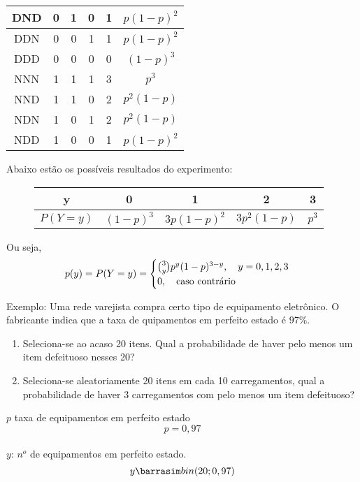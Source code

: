 \documentclass[11pt,a4paper]{book}
\begin{document}
\begin{description}
\begin{tabular}{c c c c c c }
       DND& 0 & 1 & 0 & 1 & $p(1-p)^2$\\\midrule

       DDN& 0 & 0 & 1 & 1 & $p(1-p)^2$\\\midrule

       DDD&  0 & 0 & 0 & 0 & $(1-p)^3$\\\midrule

       NNN&   1 & 1 & 1 & 3 & $p^3$\\\midrule

       NND& 1 & 1 & 0 & 2 & $p^2(1-p)$\\\midrule

       NDN& 1 & 0 & 1 & 2 & $p^2(1-p)$\\\midrule

       NDD& 1 & 0 & 0 & 1 & $p(1-p)^2$ \\ \bottomrule

     \end{tabular}

     Abaixo estão os possíveis resultados do experimento:


     \begin{figure} 
       \centering
       \begin{tabular}{c c c c c}
         \toprule
         y&0&1&2&3\\ \midrule
         $P(Y=y)$&$(1-p)^3$&$3p(1-p)^2$&$3p^2(1-p)$&$p^3$\\ \bottomrule
       \end{tabular}
       \label{fig:127}
     \end{figure}
      Ou seja,
      \begin{align*}
        p(y)=P(Y=y)=\begin{cases}
          \binom{3}{y}p^y (1-p)^{3-y}, \text{\quad}y=0,1,2,3\\
          0, \text{\quad caso contrário}
        \end{cases}
      \end{align*}
    \item{Exemplo}: Uma rede varejista compra certo tipo de equipamento eletrônico. O 
      fabricante indica que a taxa de quipamentos em perfeito estado é $97\%$.
      \begin{enumerate}[label=(\alph*)]
        \item Seleciona-se ao acaso 20 itens. Qual a probabilidade de haver pelo menos 
          um item defeituoso nesses 20?
        \item Seleciona-se aleatoriamente 20 itens em cada 10 carregamentos, qual a 
          probabilidade de haver 3 carregamentos com pelo menos um item defeituoso?
      \end{enumerate}
      $p$ taxa de equipamentos em perfeito estado\\
      $$p=0,97$$\\
      $y$: $n^o$ de equipamentos em perfeito estado.\\
      $$y \barrasim bin(20;0,97)$$\\


\end{description}
\end{document}
